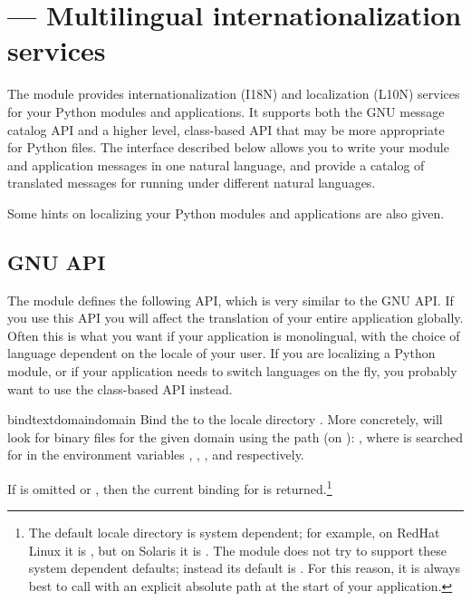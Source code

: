 \section{ ---
         Multilingual internationalization services}



The  module provides internationalization (I18N) and
localization (L10N) services for your Python modules and applications.
It supports both the GNU  message catalog API and a
higher level, class-based API that may be more appropriate for Python
files.  The interface described below allows you to write your
module and application messages in one natural language, and provide a
catalog of translated messages for running under different natural
languages.

Some hints on localizing your Python modules and applications are also
given.

\subsection{GNU  API}

The  module defines the following API, which is very
similar to the GNU  API.  If you use this API you
will affect the translation of your entire application globally.  Often
this is what you want if your application is monolingual, with the choice
of language dependent on the locale of your user.  If you are
localizing a Python module, or if your application needs to switch
languages on the fly, you probably want to use the class-based API
instead.

\begin{funcdesc}{bindtextdomain}{domain}
Bind the  to the locale directory
.  More concretely,  will look for
binary  files for the given domain using the path (on \UNIX):
,
where  is searched for in the environment variables
, , , and
 respectively.

If  is omitted or , then the current binding
for  is returned.\footnote{
        The default locale directory is system dependent; for example,
        on RedHat Linux it is , but on Solaris
        it is .  The  module
        does not try to support these system dependent defaults;
        instead its default is .
        For this reason, it is always best to call
         with an explicit absolute path at
        the start of your application.}
\end{funcdesc}

